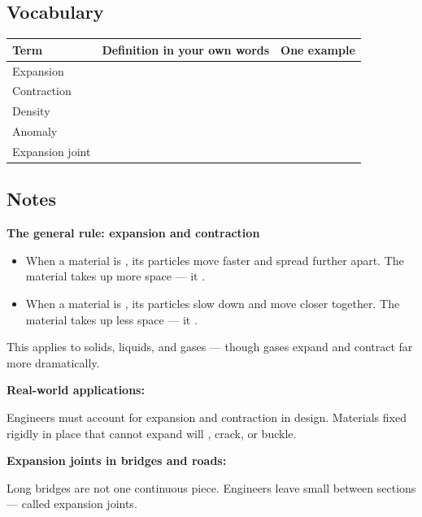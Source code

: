 \documentclass[11pt, a4paper]{article}
\newcommand{\blank}[1]{\underline{\hspace{#1}}}
\begin{document}
\subsection{Vocabulary}

\begin{tabularx}{\linewidth}{|l|X|X|}
\hline
\rowcolor{accentlight}
\textbf{Term} & \textbf{Definition in your own words} & \textbf{One example} \\
\hline
Expansion & & \\[16pt]
\hline
Contraction & & \\[16pt]
\hline
Density & & \\[16pt]
\hline
Anomaly & & \\[16pt]
\hline
Expansion joint & & \\[16pt]
\hline
\end{tabularx}

\subsection{Notes}

\textbf{The general rule: expansion and contraction}

\begin{itemize}[noitemsep, topsep=2pt]
  \item When a material is \blank{2.5cm}, its particles move faster and spread further apart. The material takes up more space --- it \blank{2.5cm}.
  \item When a material is \blank{2.5cm}, its particles slow down and move closer together. The material takes up less space --- it \blank{2.5cm}.
\end{itemize}

This applies to solids, liquids, and gases --- though gases expand and contract far more dramatically.

\medskip
\textbf{Real-world applications:}

Engineers must account for expansion and contraction in design. Materials fixed rigidly in place that cannot expand will \blank{3cm}, crack, or buckle.

\medskip
\textbf{Expansion joints in bridges and roads:}

Long bridges are not one continuous piece. Engineers leave small \blank{3cm} between sections --- called expansion joints.
\end{document}
